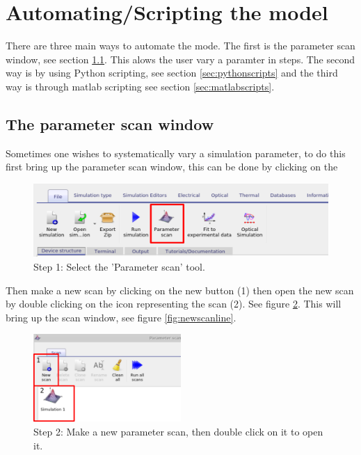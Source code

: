 \newpage
\section{Automating/Scripting the model}
There are three main ways to automate the mode. The first is the parameter scan window, see section \ref{sec:scanwindow}.  This alows the user vary a paramter in steps. The second way is by using Python scripting, see section \ref{sec:pythonscripts} and the third way is through matlab scripting see section \ref{sec:matlabscripts}. 

\subsection{The parameter scan window}
\label{sec:scanwindow}

Sometimes one wishes to systematically vary a simulation parameter, to do this first bring up the parameter scan window, this can be done by clicking on the 




\begin{figure}[H]
\centering
\includegraphics[width=\textwidth]{./images/param_scan.png}
{\caption{Step 1: Select the 'Parameter scan' tool.}}
\label{overflow}
\end{figure}

Then make a new scan by clicking on the new button (1) then open the new scan by double clicking on the icon representing the scan (2). See figure \ref{fig:newscan}. This will bring up the scan window, see figure \ref{fig:newscanline}.

\begin{figure}[H]
\centering
\includegraphics[width=0.5\textwidth]{./images/param_scan_new.png}
\caption{Step 2: Make a new parameter scan, then double click on it to open it.}
\label{fig:newscan}
\end{figure}

